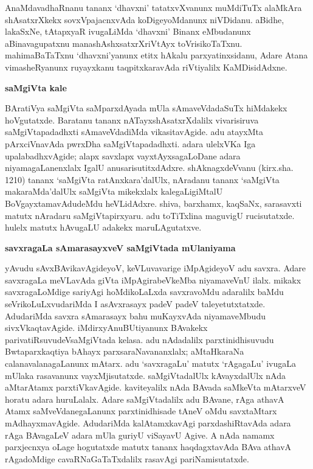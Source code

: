 AnaMdavadhaRnanu tananx `dhavxni' tatatxvXvanunx muMdiTuTx alaMkAra shAsatxrXkekx sovxVpajacnx\-vAda koDigeyoMdanunx niVDidanu. aBidhe, lakaSxNe, tAtapxyaR ivugaLiMda `dhavxni' Binanx eMbudanunx aBinavagupatxnu manashAshxsatxrXriVtAyx toVrisikoTaTxnu. mahimaBaTaTxnu `dhavxni'yanunx etitx hAkalu parxyatinxsidanu, Adare Atana vimasheRyanunx ruyayxkanu taqpitxkaravAda riVtiyalilx KaMDisidAdxne.

\smallskip
\begin{center}
{\Large\bf saMgiVta kale}
\end{center}

BAratiVya saMgiVta saMparxdAyada mUla sAmaveVdadaSuTx hiMdakekx hoVgutatxde. Baratanu tananx nATayxshAsatxrXdalilx vivarisiruva saMgiVtapadadhxti sAmaveVdadiMda vikasita\break\-vAgide. adu atayxMta pArxciVnavAda pwrxDha saMgiVtapadadhxti. adara ulelxVKa Iga upa\-labadhxvAgide; alapx savxlapx vayxtAyxsagaLoDane adara niyamagaLanenxlalx IgalU anusarisu\-titxdAdxre. shAknagxdeVvanu (kirx.sha. 1210) tananx `saMgiVta ratAnxkara'dalUlx, nAradanu tananx `saMgiVta makaraMda'dalUlx saMgiVta mikekxlalx kalegaLigiMtalU BoVgayxtamavAdudeMdu heVLidAdxre. shiva, barxhamx, kaqSaNx, sarasavxti matutx nAradaru saMgiVtapirxyaru. adu toTiTxlina maguvigU rucisutatxde. hulelx matutx hAvugaLU adakekx maruLAgutatxve.

\smallskip
\begin{center}
{\Large\bf savxragaLa sAmarasayxveV saMgiVtada mUlaniyama}
\end{center}

yAvudu sAvxBAvikavAgideyoV, keVLuvavarige iMpAgideyoV adu savxra. Adare savxragaLa meVLavAda giVta iMpAgirabeVkeMba niyamaveVnU ilalx. mikakx savxragaLoMdige sariyAgi hoMdikoLaLxda savxravoMdu adaralilx baMdu seVrikoLuLxvudariMda I asAvx\-rasayx padeV padeV taleyetutxtatxde. AdudariMda savxra sAmarasayx bahu muKayxvAda niyama\break\-veMbudu sivxVkaqtavAgide. iMdirxyAnuBUtiyanunx BAvakekx parivatiRsuvudeV\break saMgiVtada kelasa. adu nAdadalilx parxtinidhisuvudu Bwtaparxkaqtiya bAhayx parxsaraNavananxlalx; aMtaHkaraNa calanavalanagaLanunx mAtarx. adu `savxragaLu' matutx `rAgagaLu' ivugaLa mUlaka rasavanunx vayxMjisutatxde. saMgiVtadalUlx kAvayxdalUlx nAda aMtarAtamx parxtiVka\-vAgide. kaviteyalilx nAda BAvada saMkeVta mAtarxveV horatu adara huruLalalx. Adare saMgiVtadalilx adu BAvane, rAga athavA Atamx saMveVdanegaLanunx parxtinidhisade tAneV oMdu savxtaMtarx mAdhayxmavAgide. AdudariMda kalAtamxkavAgi parxdashiRtavAda adara rAga BAvagaLeV adara mUla guriyU viSayavU Agive. A nAda namamx parxjecnxya oLage hogutatxde matutx tananx haqdagxtavAda BAva athavA rAgadoMdige cavaRNaGaTaTxdalilx rasavAgi pariNamisutatxde.


